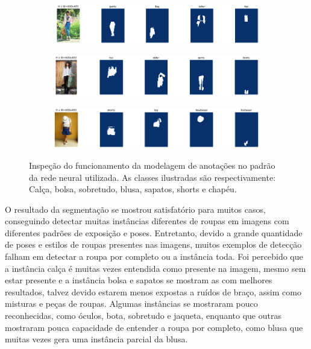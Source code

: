 \documentclass[12pt]{report}
\begin{document}
\begin{figure}
  \centering
  \begin{subfigure}[b]{\textwidth}
  \centering
    \includegraphics[scale=0.8]{images/mask1.png}
    \label{fig:mask1}
  \end{subfigure}
  \centering
  \begin{subfigure}[b]{\textwidth}
  \centering
    \includegraphics[scale=0.8]{images/mask3.png}
    \label{fig:mask3}
  \end{subfigure}
  \centering
  \begin{subfigure}[b]{\textwidth}
  \centering
    \includegraphics[scale=0.8]{images/mask2.png}
    \label{fig:mask2}
  \end{subfigure}
  \caption{Inspeção do funcionamento da modelagem de anotações no padrão da rede neural utilizada. As classes ilustradas são respectivamente: Calça, bolsa, sobretudo, blusa, sapatos, shorts e chapéu.}
  \label{fig:masks}
\end{figure}
 
O resultado da segmentação se mostrou satisfatório para muitos casos, conseguindo detectar muitas instâncias diferentes de roupas em imagens com diferentes padrões de exposição e poses. Entretanto, devido a grande quantidade de poses e estilos de roupas presentes nas imagens, muitos exemplos de detecção falham em detectar a roupa por completo ou a instância toda. Foi percebido que a instância calça é muitas vezes entendida como presente na imagem, mesmo sem estar presente e a instância bolsa e sapatos se mostram as com melhores resultados, talvez devido estarem menos expostas a ruídos de braço, assim como misturas e peças de roupas. Algumas instâncias se mostraram pouco reconhecidas, como óculos, bota, sobretudo e jaqueta, enquanto que outras mostraram pouca capacidade de entender a roupa por completo, como blusa que muitas vezes gera uma instância parcial da blusa. 
\end{document}
